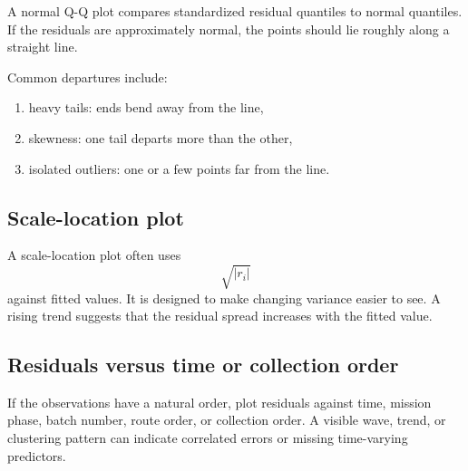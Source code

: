 A normal Q-Q plot compares standardized residual quantiles to normal quantiles.  If the residuals are approximately normal, the points should lie roughly along a straight line.

Common departures include:
\begin{enumerate}
  \item heavy tails: ends bend away from the line,
  \item skewness: one tail departs more than the other,
  \item isolated outliers: one or a few points far from the line.
\end{enumerate}

\subsection{Scale-location plot}

A scale-location plot often uses
\begin{equation}
  \sqrt{|r_i|}
\end{equation}
against fitted values.  It is designed to make changing variance easier to see.  A rising trend suggests that the residual spread increases with the fitted value.


\subsection{Residuals versus time or collection order}

If the observations have a natural order, plot residuals against time, mission phase, batch number, route order, or collection order.  A visible wave, trend, or clustering pattern can indicate correlated errors or missing time-varying predictors.

